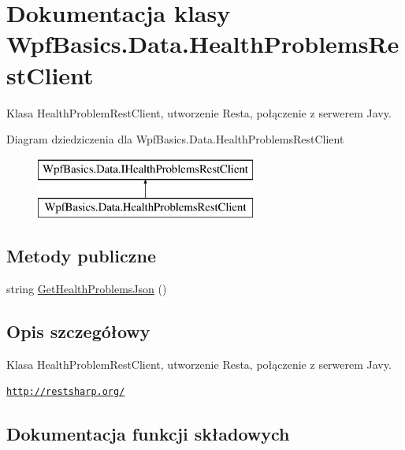 \hypertarget{class_wpf_basics_1_1_data_1_1_health_problems_rest_client}{}\section{Dokumentacja klasy Wpf\+Basics.\+Data.\+Health\+Problems\+Rest\+Client}
\label{class_wpf_basics_1_1_data_1_1_health_problems_rest_client}


Klasa Health\+Problem\+Rest\+Client, utworzenie Resta, połączenie z serwerem Javy.  


Diagram dziedziczenia dla Wpf\+Basics.\+Data.\+Health\+Problems\+Rest\+Client\begin{figure}[H]
\begin{center}
\leavevmode
\includegraphics[height=2.000000cm]{class_wpf_basics_1_1_data_1_1_health_problems_rest_client}
\end{center}
\end{figure}
\subsection*{Metody publiczne}
\begin{DoxyCompactItemize}
\item 
string \hyperlink{class_wpf_basics_1_1_data_1_1_health_problems_rest_client_ad8ba9319a858e6933c3ef860ab932cad}{Get\+Health\+Problems\+Json} ()
\end{DoxyCompactItemize}


\subsection{Opis szczegółowy}
Klasa Health\+Problem\+Rest\+Client, utworzenie Resta, połączenie z serwerem Javy. 

\href{http://restsharp.org/}{\tt http\+://restsharp.\+org/} 

\subsection{Dokumentacja funkcji składowych}
\mbox{\label{class_wpf_basics_1_1_data_1_1_health_problems_rest_client_ad8ba9319a858e6933c3ef860ab932cad}} 
